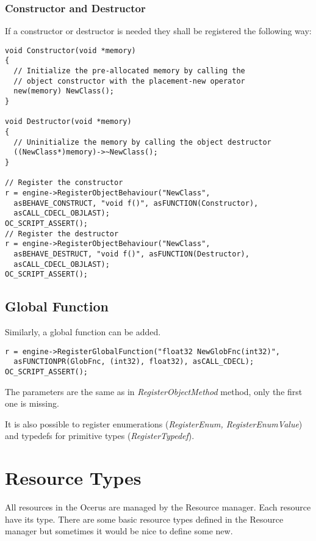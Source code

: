 \documentclass[a4paper, 12pt]{report}
\begin{document}
\subsection{Constructor and Destructor}

If a constructor or destructor is needed they shall be registered the following way:

\footnotesize 
\begin{verbatim}
void Constructor(void *memory)
{
  // Initialize the pre-allocated memory by calling the
  // object constructor with the placement-new operator
  new(memory) NewClass();
}

void Destructor(void *memory)
{
  // Uninitialize the memory by calling the object destructor
  ((NewClass*)memory)->~NewClass();
}

// Register the constructor
r = engine->RegisterObjectBehaviour("NewClass",
  asBEHAVE_CONSTRUCT, "void f()", asFUNCTION(Constructor),
  asCALL_CDECL_OBJLAST);
OC_SCRIPT_ASSERT();
// Register the destructor
r = engine->RegisterObjectBehaviour("NewClass",
  asBEHAVE_DESTRUCT, "void f()", asFUNCTION(Destructor),
  asCALL_CDECL_OBJLAST);
OC_SCRIPT_ASSERT();

\end{verbatim}
\normalsize

\section{Global Function}
Similarly, a global function can be added.

\footnotesize 
\begin{verbatim}
r = engine->RegisterGlobalFunction("float32 NewGlobFnc(int32)", 
  asFUNCTIONPR(GlobFnc, (int32), float32), asCALL_CDECL);
OC_SCRIPT_ASSERT();
\end{verbatim}
\normalsize

The parameters are the same as in \emph{RegisterObjectMethod} method, only the first one is missing.

 It is also possible to register enumerations (\emph{RegisterEnum, RegisterEnumValue}) and typedefs for primitive types (\emph{RegisterTypedef}).

\chapter{Resource Types}

All resources in the Ocerus are managed by the Resource manager. Each resource have its type. There are some basic resource types defined in the Resource manager but sometimes it would be nice to define some new.
\end{document}
